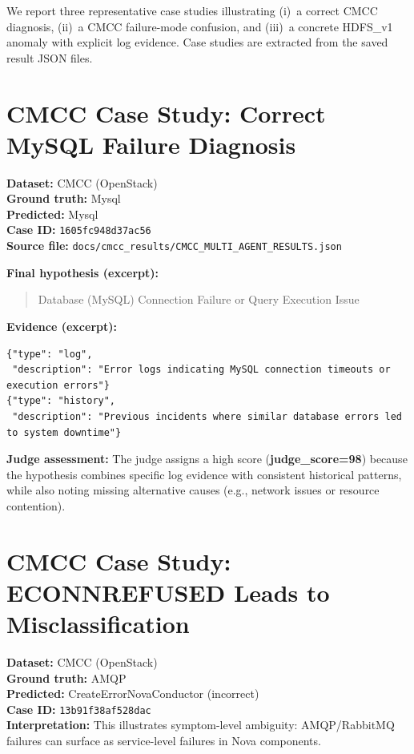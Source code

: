

We report three representative case studies illustrating (i)~a correct CMCC diagnosis,
(ii)~a CMCC failure-mode confusion, and (iii)~a concrete HDFS\_v1 anomaly with explicit log
evidence. Case studies are extracted from the saved result JSON files.

\section{CMCC Case Study: Correct MySQL Failure Diagnosis}
\textbf{Dataset:} CMCC (OpenStack)\\
\textbf{Ground truth:} Mysql\\
\textbf{Predicted:} Mysql\\
\textbf{Case ID:} \texttt{1605fc948d37ac56}\\
\textbf{Source file:} \texttt{docs/cmcc\_results/CMCC\_MULTI\_AGENT\_RESULTS.json}

\textbf{Final hypothesis (excerpt):}
\begin{quote}
Database (MySQL) Connection Failure or Query Execution Issue
\end{quote}

\textbf{Evidence (excerpt):}
\begin{lstlisting}
{"type": "log",
 "description": "Error logs indicating MySQL connection timeouts or execution errors"}
{"type": "history",
 "description": "Previous incidents where similar database errors led to system downtime"}
\end{lstlisting}

\textbf{Judge assessment:}
The judge assigns a high score (\textbf{judge\_score=98}) because the hypothesis combines
specific log evidence with consistent historical patterns, while also noting missing alternative
causes (e.g., network issues or resource contention).

\section{CMCC Case Study: ECONNREFUSED Leads to Misclassification}
\textbf{Dataset:} CMCC (OpenStack)\\
\textbf{Ground truth:} AMQP\\
\textbf{Predicted:} CreateErrorNovaConductor (incorrect)\\
\textbf{Case ID:} \texttt{13b91f38af528dac}\\
\textbf{Interpretation:} This illustrates symptom-level ambiguity: AMQP/RabbitMQ failures can
surface as service-level failures in Nova components.

